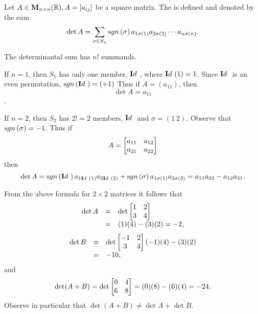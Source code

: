 \begin{df}
Let $A\in{\mathbf M}_{n\times n}( \mathbb{R}), A = [a_{ij}]$ be a square matrix.
The  is defined and denoted by the  sum $$
\det A = \sum _{\sigma \in S_n} \sgn{\sigma} a_{1\sigma
(1)}a_{2\sigma (2)} \cdots a_{n\sigma (n)}.$$ 
\end{df}
\begin{rem}
The determinantal sum has $n!$ summands.
\end{rem}
\begin{exa}
If $n = 1$, then $S_1$ has only one member, ${\mathbf Id\ }$, where
${\mathbf Id\ } (1) = 1$. Since ${\mathbf Id\ }$ is an even permutation, $\sgn{
\idefun} = (+1)$ Thus if $A = (a_{11})$, then
$$\det A
 = a_{11}$$.
\end{exa}
\begin{exa}
If $n = 2$, then  $S_2$ has $2! = 2$   members,  ${\mathbf Id\ }$ and
$\sigma =
 (1 \ 2)$. Observe that $\sgn{\sigma} = -1$. Thus if $$A = \begin{bmatrix}a_{11} & a_{12} \cr a_{21} & a_{22}\cr
 \end{bmatrix}$$ then
 $$\det A  = \sgn{\idefun}a_{1\idefun (1)}a_{2\idefun (2)} + \sgn{\sigma}a_{1\sigma (1)}a_{2\sigma (2)} = a_{11}a_{22} - a_{12}a_{21}.    $$
\end{exa}
\begin{exa}
From the above formula for $2\times 2$ matrices it follows that
$$\begin{array}{lll}\det A & = & \det \begin{bmatrix} 1 & 2 \cr 3 & 4 \cr   \end{bmatrix} \\ & = &  (1)(4) - (3)(2) = -2,\end{array} $$
$$\begin{array}{lll}\det B & = & \det \begin{bmatrix} -1 & 2 \cr 3 & 4 \cr
\end{bmatrix}(-1)(4) - (3)(2)\\ &  = &  -10, \end{array}$$ and $$ \det (A + B) = \det \begin{bmatrix} 0 & 4 \cr 6 & 8 \cr   \end{bmatrix}
 = (0)(8) - (6)(4) = -24.$$Observe in particular that $\det (A + B) \neq \det A + \det B$.
\end{exa}
